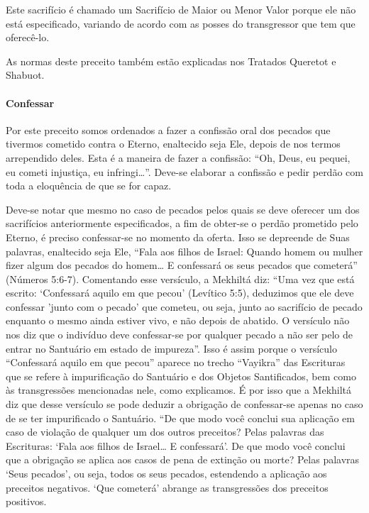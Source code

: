 Este sacrifício é chamado um Sacrifício de Maior ou Menor Valor porque
ele não está especificado, variando de acordo com as posses do
transgressor que tem que oferecê-lo.

As normas deste preceito também estão explicadas nos Tratados Queretot
e Shabuot.

\paragraph{Confessar}

Por este preceito somos ordenados a fazer a confissão oral dos pecados
que tivermos cometido contra o Eterno, enaltecido seja Ele, depois de
nos termos arrependido deles. Esta é a maneira de fazer a confissão:
``Oh, Deus, eu pequei, eu cometi injustiça, eu infringi\ldots{}''. Deve-se elaborar a
confissão e pedir perdão com toda a eloquência de que se for capaz.

Deve-se notar que mesmo no caso de pecados pelos quais se deve oferecer
um dos sacrifícios anteriormente especificados, a fim de obter-se o
perdão prometido pelo Eterno, é preciso confessar-se no momento da
oferta. Isso se depreende de Suas palavras, enaltecido seja Ele, ``Fala
aos filhos de Israel: Quando homem ou mulher fizer algum dos pecados do
homem\ldots{} E confessará os seus pecados que cometerá'' (Números 5:6-7).
Comentando esse versículo, a Mekhiltá diz: ``Uma vez que está escrito:
`Confessará aquilo em que pecou' (Levítico 5:5), deduzimos que ele deve
confessar 'junto com o pecado' que cometeu, ou seja, junto ao sacrifício
de pecado enquanto o mesmo ainda estiver vivo, e não depois de abatido.
O versículo não nos diz que o indivíduo deve confessar-se por qualquer
pecado a não ser pelo de entrar no Santuário em estado de impureza''.
Isso é assim porque o versículo ``Confessará aquilo em que pecou''
aparece no trecho ``Vayikra'' das Escrituras que se refere à
impurificação do Santuário e dos Objetos Santificados, bem como às
transgressões mencionadas nele, como explicamos. É por isso que a
Mekhiltá diz que desse versículo se pode deduzir a obrigação de
confessar-se apenas no caso de se ter impurificado o Santuário. ``De que
modo você conclui sua aplicação em caso de violação de qualquer um dos
outros preceitos? Pelas palavras das Escrituras: `Fala aos filhos de
Israel\ldots{} E confessará'. De que modo você conclui que a obrigação se
aplica aos casos de pena de extinção ou morte? Pelas palavras `Seus
pecados', ou seja, todos os seus pecados, estendendo a aplicação aos
preceitos negativos. `Que cometerá' abrange as transgressões dos
preceitos positivos.

